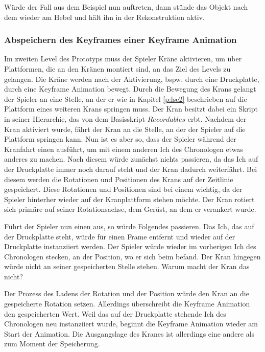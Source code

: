 Würde der Fall aus dem Beispiel nun auftreten, dann stünde das Objekt nach dem  wieder am Hebel und hält ihn in der Rekonstruktion aktiv.

\subsubsection{Abspeichern des Keyframes einer Keyframe Animation}
Im zweiten Level des Prototyps muss der Spieler Kräne aktivieren, um über Plattformen, die an den Kränen montiert sind, an das Ziel des Levels zu gelangen. Die Kräne werden nach der Aktivierung, bspw. durch eine Druckplatte, durch eine Keyframe Animation bewegt. Durch die Bewegung des Krans gelangt der Spieler an eine Stelle, an der er wie in Kapitel \ref{p:lse2} beschrieben auf die Plattform eines weiteren Krans springen muss. Der Kran besitzt dabei ein Skript in seiner Hierarchie, das von dem Basisskript $Recordables$ erbt. Nachdem der Kran aktiviert wurde, fährt der Kran an die Stelle, an der der Spieler auf die Plattform springen kann. Nun ist es aber so, dass der Spieler während der Kranfahrt einen  ausführt, um mit einem anderen Ich des Chronologen etwas anderes zu machen. Nach diesem  würde zunächst nichts passieren, da das Ich auf der Druckplatte immer noch darauf steht und der Kran dadurch weiterfährt. Bei diesem  werden die Rotationen und Positionen des Krans auf der Zeitlinie gespeichert. Diese Rotationen und Positionen sind bei einem  wichtig, da der Spieler hinterher wieder auf der Kranplattform stehen möchte. Der Kran rotiert sich primäre auf seiner Rotationsachse, dem Gerüst, an dem er verankert wurde. 

Führt der Spieler nun einen  aus, so würde Folgendes passieren. Das Ich, das auf der Druckplatte steht, würde für einen Frame entfernt und wieder auf der Druckplatte instanziiert werden. Der Spieler würde wieder im vorherigen Ich des Chronologen stecken, an der Position, wo er sich beim  befand. Der Kran hingegen würde nicht an seiner gespeicherten Stelle stehen. Warum macht der Kran das nicht?

Der Prozess des Ladens der Rotation und der Position würde den Kran an die gespeicherte Rotation setzen. Allerdings überschreibt die Keyframe Animation den gespeicherten Wert. Weil das auf der Druckplatte stehende Ich des Chronologen neu instanziiert wurde, beginnt die Keyframe Animation wieder am Start der Animation. Die Ausgangslage des Kranes ist allerdings eine andere als zum Moment der Speicherung.  

